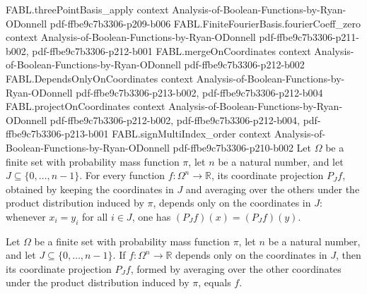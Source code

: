 \begin{theorem}
  {FABL.threePointBasis_apply}
  {context}
  {Analysis-of-Boolean-Functions-by-Ryan-ODonnell}
  {pdf-ffbe9c7b3306-p209-b006}
\proofstep
  {FABL.FiniteFourierBasis.fourierCoeff_zero}
  {context}
  {Analysis-of-Boolean-Functions-by-Ryan-ODonnell}
  {pdf-ffbe9c7b3306-p211-b002,
    pdf-ffbe9c7b3306-p212-b001}
\proofstep
  {FABL.mergeOnCoordinates}
  {context}
  {Analysis-of-Boolean-Functions-by-Ryan-ODonnell}
  {pdf-ffbe9c7b3306-p212-b002}
\proofstep
  {FABL.DependsOnlyOnCoordinates}
  {context}
  {Analysis-of-Boolean-Functions-by-Ryan-ODonnell}
  {pdf-ffbe9c7b3306-p213-b002,
    pdf-ffbe9c7b3306-p212-b004}
\proofstep
  {FABL.projectOnCoordinates}
  {context}
  {Analysis-of-Boolean-Functions-by-Ryan-ODonnell}
  {pdf-ffbe9c7b3306-p212-b002,
    pdf-ffbe9c7b3306-p212-b004,
    pdf-ffbe9c7b3306-p213-b001}
\proofstep
  {FABL.signMultiIndex_order}
  {context}
  {Analysis-of-Boolean-Functions-by-Ryan-ODonnell}
  {pdf-ffbe9c7b3306-p210-b002}
Let $\Omega$ be a finite set with probability mass function $\pi$, let $n$ be a natural
number, and let $J\subseteq\{0,\ldots,n-1\}$. For every function
$f:\Omega^n\to\mathbb{R}$, its coordinate projection $P_Jf$, obtained by keeping the
coordinates in $J$ and averaging over the others under the product distribution induced
by $\pi$, depends only on the coordinates in $J$: whenever $x_i=y_i$ for all $i\in J$,
one has $(P_Jf)(x)=(P_Jf)(y)$.
\end{theorem}

\begin{theorem}
\label{FABL.projectOnCoordinates_eq_self_of_dependsOnly}
\leanok
{}
Let $\Omega$ be a finite set with probability mass function $\pi$, let $n$ be a natural
number, and let $J\subseteq\{0,\ldots,n-1\}$. If $f:\Omega^n\to\mathbb{R}$ depends only
on the coordinates in $J$, then its coordinate projection $P_Jf$, formed by averaging
over the other coordinates under the product distribution induced by $\pi$, equals $f$.
\end{theorem}

